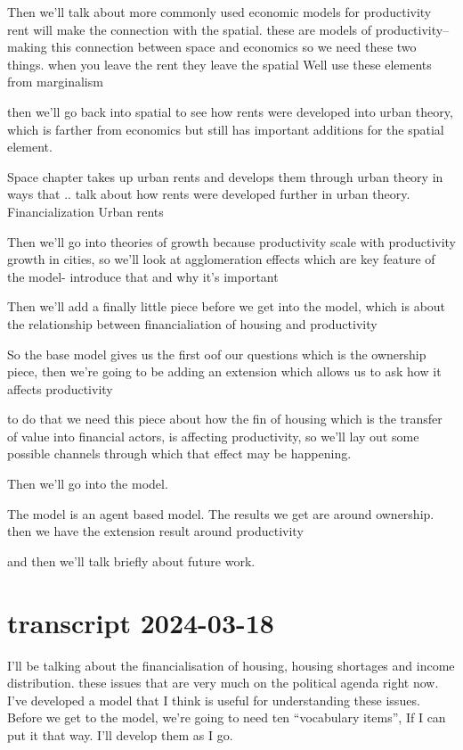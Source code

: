 Then we'll talk about more commonly used economic models for productivity
rent will make the connection with the spatial. 
these are models of productivity-- making this connection between space and economics so we need these two things.
when you leave the rent they leave the spatial
Well use these elements from marginalism


then we'll go back into spatial to see how rents were developed into urban theory, which is farther from economics but still has important additions for the spatial element. 

Space chapter takes up urban rents and develops them through urban theory in ways that .. talk about how rents were developed further in urban theory.
Financialization
Urban rents

Then we'll go into theories of growth because productivity scale with productivity growth in cities, so we'll look at agglomeration effects which are key feature of the model- introduce that and why it's important

Then we'll add a finally little piece before we get  into the model,  which is about the relationship between financialiation of housing and productivity


So the base model gives us the first oof our questions which is the ownership piece, then we're going to be adding an extension which allows us to ask how it affects productivity

to do that we need this piece about how the fin of housing which is the transfer of value into financial actors, is affecting productivity, so we'll lay out some possible channels through which that effect may be happening.

Then we'll go into the model. 

The model is an agent based model. The results we get  are around ownership. then we have the extension result around productivity

and then we'll talk briefly about future work. 


\section{transcript 2024-03-18}

I'll be talking about the financialisation of housing, housing shortages and income distribution. these issues that are very much on the political agenda right now.  I've developed a model that I think is useful for understanding these issues.  Before we get to the model, we're going to need ten ``vocabulary items'', If I can put it that way. I'll develop them as I go.

